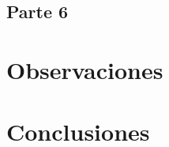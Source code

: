\documentclass[12pt]{report}
\begin{document}
\subsection*{Parte 6}

\section*{Observaciones}

\section*{Conclusiones}
\end{document}
